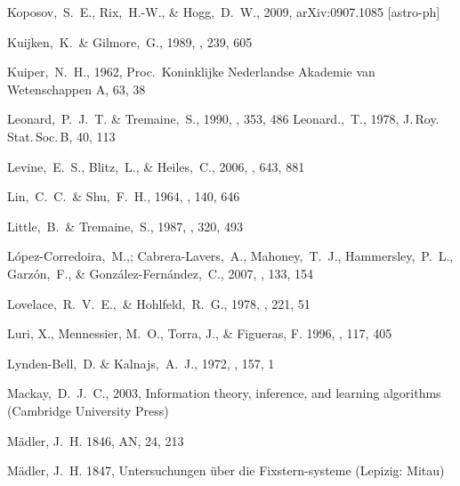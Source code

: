 \begin{thebibliography}{99}
 Koposov,~S.~E., Rix,~H.-W., \& Hogg,~D.~W., 2009, arXiv:0907.1085 [astro-ph]

  Kuijken,~K.~\& Gilmore,~G., 1989, \mnras, 239, 605

  Kuiper,~N.~H., 1962,
  Proc.~Koninklijke Nederlandse Akademie van Wetenschappen A, 63, 38

  Leonard,~P.~J.~T. \& Tremaine,~S., 1990,
  \apj, 353, 486
  Leonard.,~T., 1978,
  J.\,Roy.\,Stat.\,Soc.\,B, 40, 113

  Levine,~E.~S., Blitz,~L., \& Heiles,~C., 2006, \apj, 643, 881

  Lin,~C.~C.~\& Shu,~F.~H., 1964,
  \apj, 140, 646

  Little,~B.~\& Tremaine,~S., 1987,
  \apj, 320, 493

  L\'{o}pez-Corredoira,~M.,; Cabrera-Lavers,~A., Mahoney,~T.~J., Hammersley,~P.~L., Garz\'{o}n,~F., \& Gonz\'{a}lez-Fern\'{a}ndez,~C., 2007, \aj, 133, 154

  Lovelace,~R.~V.~E.,~\& Hohlfeld,~R.~G., 1978,
  \apj, 221, 51

{Luri}, X., {Mennessier}, M.~O., {Torra}, J., \& {Figueras}, F. 1996, \aaps,
  117, 405

  Lynden-Bell,~D. \& Kalnajs,~A.~J., 1972,
  \mnras, 157, 1

  Mackay,~D.~J.~C., 2003,
  Information theory, inference, and learning algorithms (Cambridge University Press)

{M{\"a}dler}, J.~H. 1846, AN, 24, 213

{M{\"a}dler}, J.~H. 1847, {Untersuchungen {\"u}ber die Fixstern-systeme}
  (Lepizig: Mitau)


\end{thebibliography}
